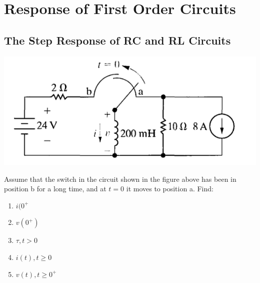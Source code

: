 \section{Response of First Order Circuits}

\subsection{The Step Response of RC and RL Circuits}
\includegraphics[scale=0.5]{img/c7/p1}

Assume that the switch in the circuit shown in the figure above has been in position b for a long
time, and at $t = 0$ it moves to position a. Find:

\begin{enumerate}
	\item $i(0^{+}$
	\item $ v(0^{+}) $
	\item $ \tau, t > 0 $
	\item $i(t), t \geq 0$
	\item $v(t), t \geq 0^{+}$
\end{enumerate}

